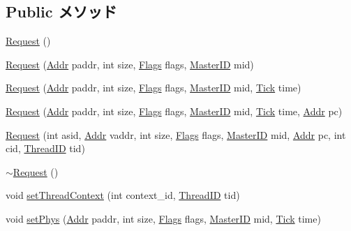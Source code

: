 \subsection*{Public メソッド}
\begin{DoxyCompactItemize}
\item 
\hyperlink{classRequest_ad69bb2076d5c4f1eb4b98cb3e0e2efa3}{Request} ()
\item 
\hyperlink{classRequest_a0f0fbabba0a0f6d8ffb2d5ec32d4d6b2}{Request} (\hyperlink{base_2types_8hh_af1bb03d6a4ee096394a6749f0a169232}{Addr} paddr, int size, \hyperlink{classFlags}{Flags} flags, \hyperlink{request_8hh_ac366b729262fd8e7cbd3283da6f775cf}{MasterID} mid)
\item 
\hyperlink{classRequest_a94b54d9620b2c2ec8d1327aa30dcd7e8}{Request} (\hyperlink{base_2types_8hh_af1bb03d6a4ee096394a6749f0a169232}{Addr} paddr, int size, \hyperlink{classFlags}{Flags} flags, \hyperlink{request_8hh_ac366b729262fd8e7cbd3283da6f775cf}{MasterID} mid, \hyperlink{base_2types_8hh_a5c8ed81b7d238c9083e1037ba6d61643}{Tick} time)
\item 
\hyperlink{classRequest_a8882f6e806e0cdfac904bffddae2a868}{Request} (\hyperlink{base_2types_8hh_af1bb03d6a4ee096394a6749f0a169232}{Addr} paddr, int size, \hyperlink{classFlags}{Flags} flags, \hyperlink{request_8hh_ac366b729262fd8e7cbd3283da6f775cf}{MasterID} mid, \hyperlink{base_2types_8hh_a5c8ed81b7d238c9083e1037ba6d61643}{Tick} time, \hyperlink{base_2types_8hh_af1bb03d6a4ee096394a6749f0a169232}{Addr} pc)
\item 
\hyperlink{classRequest_a82ca26c8ef204239a4c4204f7319b4ec}{Request} (int asid, \hyperlink{base_2types_8hh_af1bb03d6a4ee096394a6749f0a169232}{Addr} vaddr, int size, \hyperlink{classFlags}{Flags} flags, \hyperlink{request_8hh_ac366b729262fd8e7cbd3283da6f775cf}{MasterID} mid, \hyperlink{base_2types_8hh_af1bb03d6a4ee096394a6749f0a169232}{Addr} pc, int cid, \hyperlink{base_2types_8hh_ab39b1a4f9dad884694c7a74ed69e6a6b}{ThreadID} tid)
\item 
\hyperlink{classRequest_ab4e418b7b4be8c3243b478b09f10d3ed}{$\sim$Request} ()
\item 
void \hyperlink{classRequest_a40574dadf22fb92b4966eb9815da7575}{setThreadContext} (int context\_\-id, \hyperlink{base_2types_8hh_ab39b1a4f9dad884694c7a74ed69e6a6b}{ThreadID} tid)
\item 
void \hyperlink{classRequest_aeefca2329f8f252cd5c17463dc7f8fda}{setPhys} (\hyperlink{base_2types_8hh_af1bb03d6a4ee096394a6749f0a169232}{Addr} paddr, int size, \hyperlink{classFlags}{Flags} flags, \hyperlink{request_8hh_ac366b729262fd8e7cbd3283da6f775cf}{MasterID} mid, \hyperlink{base_2types_8hh_a5c8ed81b7d238c9083e1037ba6d61643}{Tick} time)

\end{DoxyCompactItemize}

